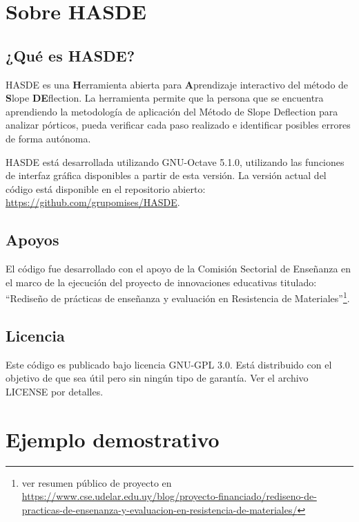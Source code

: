 
\section{Sobre HASDE}

\subsection{¿Qué es HASDE?}

HASDE es una \textbf{H}erramienta abierta para \textbf{A}prendizaje interactivo del método de \textbf{S}lope \textbf{DE}flection. %
%
La herramienta permite que la persona que se encuentra aprendiendo la metodología de aplicación del Método de Slope Deflection para analizar pórticos, pueda verificar cada paso realizado e identificar posibles errores de forma autónoma.


HASDE está desarrollada utilizando GNU-Octave 5.1.0, utilizando las funciones de interfaz gráfica disponibles a partir de esta versión. %
%
La versión actual del código está disponible en el repositorio abierto: \href{https://github.com/grupomises/HASDE}{https://github.com/grupomises/HASDE}. 

\subsection{Apoyos}
El código fue desarrollado con el apoyo de la Comisión Sectorial de Enseñanza en el marco de la ejecución del proyecto de innovaciones educativas titulado: 
``Rediseño de prácticas de enseñanza y evaluación en Resistencia de Materiales''\footnote{ver resumen público de proyecto en	\href{https://www.cse.udelar.edu.uy/blog/proyecto-financiado/rediseno-de-practicas-de-ensenanza-y-evaluacion-en-resistencia-de-materiales/}{https://www.cse.udelar.edu.uy/blog/proyecto-financiado/rediseno-de-practicas-de-ensenanza-y-evaluacion-en-resistencia-de-materiales/}}.

\subsection{Licencia}

Este código es publicado bajo licencia GNU-GPL 3.0. Está distribuido con el objetivo de que sea útil pero sin ningún tipo de garantía. Ver el archivo LICENSE por detalles.


\section{Ejemplo demostrativo}


